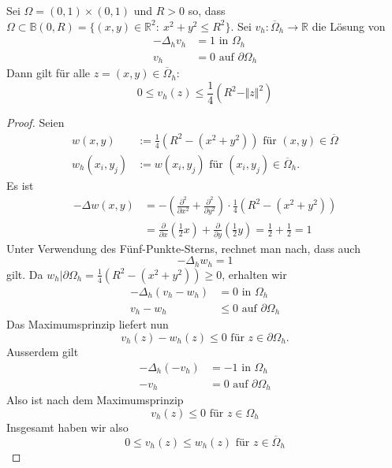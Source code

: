 \begin{lem}
Sei $\Omega = (0, 1) \times (0, 1)$ und $R > 0$ so, dass $\Omega \subset \mathbb B(0, R) = 
\{ (x,y) \in \mathbb R^2 : \ x^2 + y^2 \leq R^2 \}$.
Sei $v_h: \overline \Omega_h \to \mathbb R$ die Lösung von
\begin{align*}
- \Delta_h v_h &= 1 \text{ in } \Omega_h \\
v_h &= 0 \text{ auf } \partial \Omega_h
\end{align*}
Dann gilt für alle $z = (x, y) \in \overline \Omega_h$:
\[
0 \leq v_h(z) \leq \frac 1 4 \left( R^2 - \Vert z \Vert^2 \right)
\]
\end{lem}
\begin{proof}
Seien 
\begin{align*}
w(x, y) &:= \frac{ 1}{4} \left( R^2 - (x^2 + y^2) \right) \text{ für } (x,y) \in \overline \Omega \\
w_h(x_i, y_j) &:= w(x_i, y_j) \text{ für } (x_i, y_j) \in \overline \Omega_h .
\end{align*}
Es ist
\begin{align*}
- \Delta w(x,y) &= - \left( \frac{ \partial^2}{\partial x^2} + \frac{\partial^2}{\partial y^2} \right)
    \cdot \frac 1 4 \left( R^2 - (x^2 + y^2) \right) \\
    &= \frac{\partial }{\partial x} \left( \frac 1 2 x \right) + \frac{\partial }{\partial y}
    \left( \frac 1 2 y \right)
    = \frac 1 2 + \frac 1 2 = 1
\end{align*}
Unter Verwendung des Fünf-Punkte-Sterns, rechnet man nach, dass auch
\[
- \Delta_h w_h = 1
\]
gilt.
Da $w_h | \partial \Omega_h = \frac 1 4 \left( R^2 - (x^2 + y^2) \right) \geq 0$, erhalten wir
\begin{align*}
- \Delta_h (v_h - w_h) &= 0 \text{ in } \Omega_h \\
v_h - w_h &\leq 0 \text{ auf } \partial \Omega_h
\end{align*}
Das Maximumsprinzip liefert nun
\[
v_h(z) - w_h(z) \leq 0 \text{ für } z \in \partial \Omega_h .
\]
Ausserdem gilt
\begin{align*}
- \Delta_h (-v_h) &= -1 \text{ in } \Omega_h \\
-v_h &= 0 \text{ auf } \partial \Omega_h
\end{align*}
Also ist nach dem Maximumsprinzip
\[
v_h(z) \leq 0 \text{ für } z \in \Omega_h
\]
Insgesamt haben wir also
\[
0 \leq v_h(z) \leq w_h(z) \text{ für } z \in \overline \Omega_h
\]
\end{proof}

